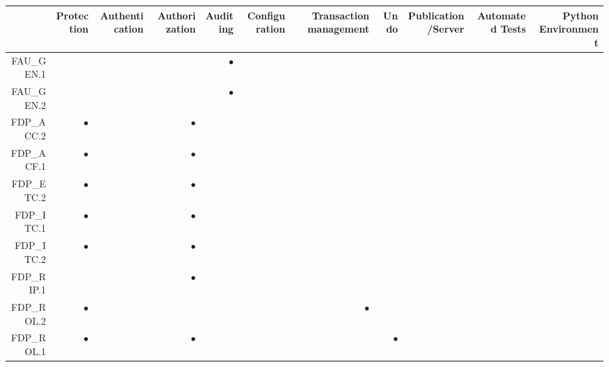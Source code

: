 \documentclass[12pt,english]{scrbook}
\newcommand{\oh}{$\bullet$}
\begin{document}
\begin{table}
    \scriptsize
    \begin{tabular}{rRRRRRRRRRR}
        \toprule
                    & Protection & Authentication & Authorization & Auditing & Configuration & Transaction management & Undo & Publication/Server & Automated Tests & Python Environment \\
        \midrule
FAU\_GEN.1          &            &                &               & \oh      &               &                        &      &                    &                 &                    \\   
FAU\_GEN.2          &            &                &               & \oh      &               &                        &      &                    &                 &                    \\   
FDP\_ACC.2          & \oh        &                &  \oh          &          &               &                        &      &                    &                 &                    \\   
FDP\_ACF.1          & \oh        &                &  \oh          &          &               &                        &      &                    &                 &                    \\   
FDP\_ETC.2          & \oh        &                &  \oh          &          &               &                        &      &                    &                 &                    \\   
FDP\_ITC.1          & \oh        &                &  \oh          &          &               &                        &      &                    &                 &                    \\   
FDP\_ITC.2          & \oh        &                &  \oh          &          &               &                        &      &                    &                 &                    \\   
FDP\_RIP.1          &            &                &  \oh          &          &               &                        &      &                    &                 &                    \\   
FDP\_ROL.2          & \oh        &                &               &          &               & \oh                    &      &                    &                 &                    \\   
FDP\_ROL.1          & \oh        &                &  \oh          &          &               &                        & \oh  &                    &                 &                    \\   

\end{tabular}
\end{table}
\end{document}
